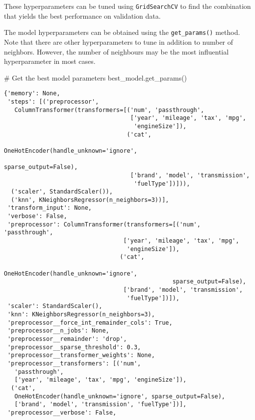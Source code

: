 \documentclass[
  letterpaper,
  DIV=11,
  numbers=noendperiod]{scrreprt}
\newenvironment{Shaded}{\begin{snugshade}}{\end{snugshade}}
\newcommand{\CommentTok}[1]{\textcolor[rgb]{0.37,0.37,0.37}{#1}}
\newcommand{\NormalTok}[1]{\textcolor[rgb]{0.00,0.23,0.31}{#1}}
\begin{document}
These hyperparameters can be tuned using \texttt{GridSearchCV} to find
the combination that yields the best performance on validation data.

The model hyperparameters can be obtained using the
\texttt{get\_params()} method. Note that there are other hyperparameters
to tune in addition to number of neighbors. However, the number of
neighbours may be the most influential hyperparameter in most cases.

\begin{Shaded}
\begin{Highlighting}[]
\CommentTok{\# Get the best model parameters}
\NormalTok{best\_model.get\_params()}
\end{Highlighting}
\end{Shaded}

\begin{verbatim}
{'memory': None,
 'steps': [('preprocessor',
   ColumnTransformer(transformers=[('num', 'passthrough',
                                    ['year', 'mileage', 'tax', 'mpg',
                                     'engineSize']),
                                   ('cat',
                                    OneHotEncoder(handle_unknown='ignore',
                                                  sparse_output=False),
                                    ['brand', 'model', 'transmission',
                                     'fuelType'])])),
  ('scaler', StandardScaler()),
  ('knn', KNeighborsRegressor(n_neighbors=3))],
 'transform_input': None,
 'verbose': False,
 'preprocessor': ColumnTransformer(transformers=[('num', 'passthrough',
                                  ['year', 'mileage', 'tax', 'mpg',
                                   'engineSize']),
                                 ('cat',
                                  OneHotEncoder(handle_unknown='ignore',
                                                sparse_output=False),
                                  ['brand', 'model', 'transmission',
                                   'fuelType'])]),
 'scaler': StandardScaler(),
 'knn': KNeighborsRegressor(n_neighbors=3),
 'preprocessor__force_int_remainder_cols': True,
 'preprocessor__n_jobs': None,
 'preprocessor__remainder': 'drop',
 'preprocessor__sparse_threshold': 0.3,
 'preprocessor__transformer_weights': None,
 'preprocessor__transformers': [('num',
   'passthrough',
   ['year', 'mileage', 'tax', 'mpg', 'engineSize']),
  ('cat',
   OneHotEncoder(handle_unknown='ignore', sparse_output=False),
   ['brand', 'model', 'transmission', 'fuelType'])],
 'preprocessor__verbose': False,

\end{verbatim}
\end{document}
